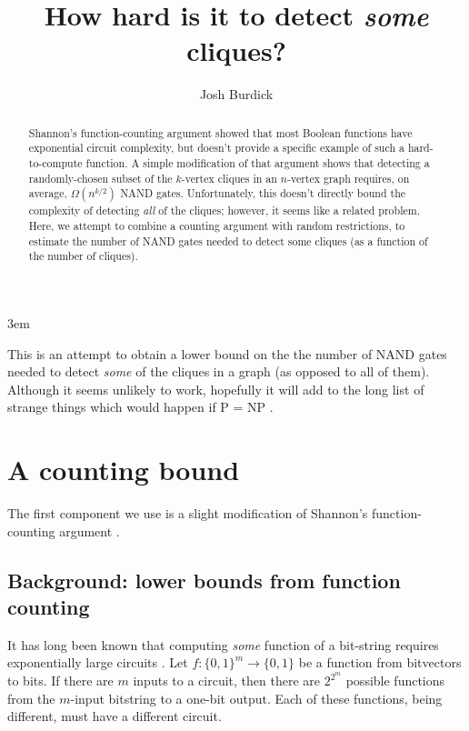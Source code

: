 \documentclass[12pt]{article}
\theoremstyle{definition}
\begin{document}
\emergencystretch 3em
\title{How hard is it to detect {\em some} cliques?}

\author{Josh Burdick}

\maketitle

\begin{abstract}
Shannon's function-counting argument
\cite{shannon_synthesis_1949} showed that most Boolean functions have
exponential circuit complexity, but doesn't provide a specific example
of such a hard-to-compute function. A simple modification of that argument
shows that detecting a randomly-chosen subset of the $k$-vertex cliques in an
$n$-vertex graph requires, on average, $\Omega(n^{k/2})$ NAND gates.
Unfortunately,
this doesn't directly bound the complexity of detecting {\em all} of the cliques;
however, it seems like a related problem.
Here, we attempt to combine a counting argument with
random restrictions, to estimate the number
of NAND gates needed to detect some cliques (as a function
of the number of cliques).
\end{abstract}

\newpage

\tableofcontents

This is an attempt to obtain a lower bound on the the number of NAND gates
needed to detect {\em some} of the cliques in a graph (as opposed to
all of them).
Although it seems unlikely to work, hopefully
it will add to the long list of strange things which would happen
if P = NP \cite{fenner1996complexity}.

\section{A counting bound}
\label{countingBound}

The first component we use is a slight modification
of Shannon's function-counting argument
\cite{shannon_synthesis_1949}.

\subsection{Background: lower bounds from function counting}

It has long been known that computing {\em some} function of a bit-string
requires exponentially large circuits \cite{shannon_synthesis_1949}.
Let $f: \{0,1\}^m \rightarrow \{0,1\}$ be a function from bitvectors to bits.
If there are $m$ inputs to a circuit,
then there are $2^{2^m}$ possible functions from the $m$-input bitstring to
a one-bit output. Each of these functions, being different, must have a
different circuit.
\end{document}
